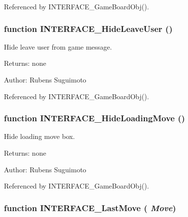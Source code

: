 Referenced by INTERFACE\_\-GameBoardObj().
\subsubsection[INTERFACE\_\-HideLeaveUser]{\setlength{\rightskip}{0pt plus 5cm}function INTERFACE\_\-HideLeaveUser ()}\label{board_8js_c233d31fdd2833360132e729437ed590}


Hide leave user from game message. 

\begin{Desc}
\item[Returns:]none \end{Desc}
\begin{Desc}
\item[Author:]Rubens Suguimoto \end{Desc}


Referenced by INTERFACE\_\-GameBoardObj().
\subsubsection[INTERFACE\_\-HideLoadingMove]{\setlength{\rightskip}{0pt plus 5cm}function INTERFACE\_\-HideLoadingMove ()}\label{board_8js_e9b7249bc30fdc766ec5969acfbb0ce2}


Hide loading move box. 

\begin{Desc}
\item[Returns:]none \end{Desc}
\begin{Desc}
\item[Author:]Rubens Suguimoto \end{Desc}


Referenced by INTERFACE\_\-GameBoardObj().
\subsubsection[INTERFACE\_\-LastMove]{\setlength{\rightskip}{0pt plus 5cm}function INTERFACE\_\-LastMove ( {\em Move})}\label{board_8js_bc3bce8361d3408e53c14848db12270e}


